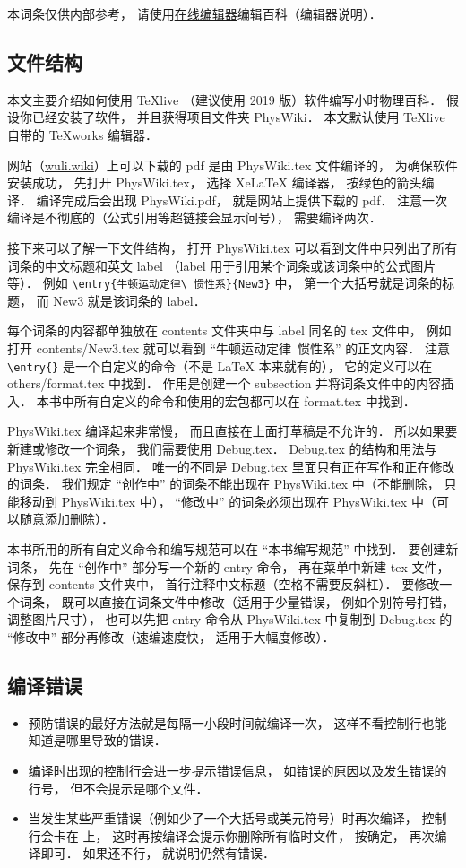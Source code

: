 
本词条仅供内部参考， 请使用\href{http://wuli.wiki/editor}{在线编辑器}编辑百科（编辑器说明）．

\subsection{文件结构}

本文主要介绍如何使用 TeXlive （建议使用 2019 版）软件编写小时物理百科． 假设你已经安装了软件， 并且获得项目文件夹 PhysWiki． 本文默认使用 TeXlive 自带的 TeXworks 编辑器．

网站（\href{http://wuli.wiki}{wuli.wiki}）上可以下载的 pdf 是由 PhysWiki.tex 文件编译的， 为确保软件安装成功， 先打开 PhysWiki.tex， 选择 XeLaTeX 编译器， 按绿色的箭头编译． 编译完成后会出现 PhysWiki.pdf， 就是网站上提供下载的 pdf． 注意一次编译是不彻底的（公式引用等超链接会显示问号）， 需要编译两次．

接下来可以了解一下文件结构， 打开 PhysWiki.tex 可以看到文件中只列出了所有词条的中文标题和英文 label （label 用于引用某个词条或该词条中的公式图片等）． 例如 \lstinline|\entry{牛顿运动定律\ 惯性系}{New3}| 中， 第一个大括号就是词条的标题， 而 New3 就是该词条的 label．

每个词条的内容都单独放在 contents 文件夹中与 label 同名的 tex 文件中， 例如打开 contents/New3.tex 就可以看到 “牛顿运动定律\ 惯性系” 的正文内容． 注意 \lstinline|\entry{}| 是一个自定义的命令（不是 LaTeX 本来就有的）， 它的定义可以在 others/format.tex 中找到． 作用是创建一个 subsection 并将词条文件中的内容插入． 本书中所有自定义的命令和使用的宏包都可以在 format.tex 中找到．

PhysWiki.tex 编译起来非常慢， 而且直接在上面打草稿是不允许的． 所以如果要新建或修改一个词条， 我们需要使用 Debug.tex． Debug.tex 的结构和用法与 PhysWiki.tex 完全相同． 唯一的不同是 Debug.tex 里面只有正在写作和正在修改的词条． 我们规定 “创作中” 的词条不能出现在 PhysWiki.tex 中（不能删除， 只能移动到 PhysWiki.tex 中）， “修改中” 的词条必须出现在 PhysWiki.tex 中（可以随意添加删除）．

本书所用的所有自定义命令和编写规范可以在 “本书编写规范” 中找到． 要创建新词条， 先在 “创作中” 部分写一个新的 entry 命令， 再在菜单中新建 tex 文件， 保存到 contents 文件夹中， 首行注释中文标题（空格不需要反斜杠）． 要修改一个词条， 既可以直接在词条文件中修改（适用于少量错误， 例如个别符号打错， 调整图片尺寸）， 也可以先把 entry 命令从 PhysWiki.tex 中复制到 Debug.tex 的 “修改中” 部分再修改（速编速度快， 适用于大幅度修改）．

\subsection{编译错误}

\begin{itemize}
\item 预防错误的最好方法就是每隔一小段时间就编译一次， 这样不看控制行也能知道是哪里导致的错误．
\item 编译时出现的控制行会进一步提示错误信息， 如错误的原因以及发生错误的行号， 但不会提示是哪个文件．
\item 当发生某些严重错误（例如少了一个大括号或美元符号）时再次编译， 控制行会卡在 \lstinline|| 上， 这时再按编译会提示你删除所有临时文件， 按确定， 再次编译即可． 如果还不行， 就说明仍然有错误．
\end{itemize}
